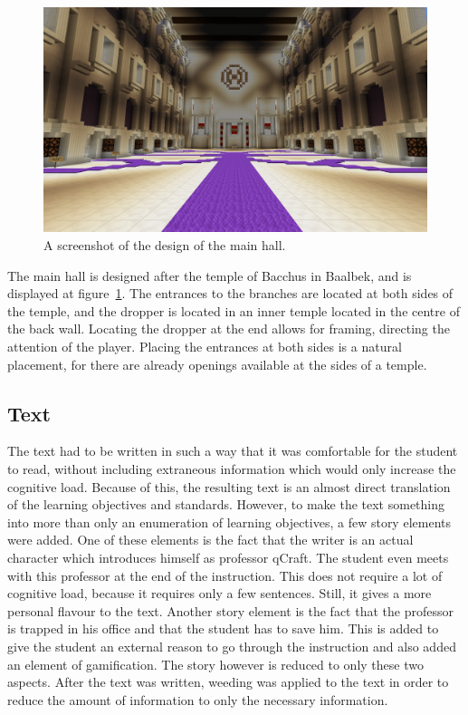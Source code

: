 \documentclass[11pt,twoside]{report} %
\begin{document}
\begin{figure}[h]
\centering
\includegraphics[width=\textwidth]{mainhall}
\caption{A screenshot of the design of the main hall.\label{fig:mainhall}}
\end{figure}

The main hall is designed after the temple of Bacchus in Baalbek, and is displayed at figure~\ref{fig:mainhall}. The entrances to the branches are located at both sides of the temple, and the dropper is located in an inner temple located in the centre of the back wall. Locating the dropper at the end allows for framing, directing the attention of the player. Placing the entrances at both sides is a natural placement, for there are already openings available at the sides of a temple.

\subsection{Text}
\label{subsec:devtext}

The text had to be written in such a way that it was comfortable for the student to read, without including extraneous information which would only increase the cognitive load. Because of this, the resulting text is an almost direct translation of the learning objectives and standards. However, to make the text something into more than only an enumeration of learning objectives, a few story elements were added. One of these elements is the fact that the writer is an actual character which introduces himself as professor qCraft. The student even meets with this professor at the end of the instruction. This does not require a lot of cognitive load, because it requires only a few sentences. Still, it gives a more personal flavour to the text. Another story element is the fact that the professor is trapped in his office and that the student has to save him. This is added to give the student an external reason to go through the instruction and also added an element of gamification. The story however is reduced to only these two aspects. After the text was written, weeding was applied to the text in order to reduce the amount of information to only the necessary information.
\end{document}
